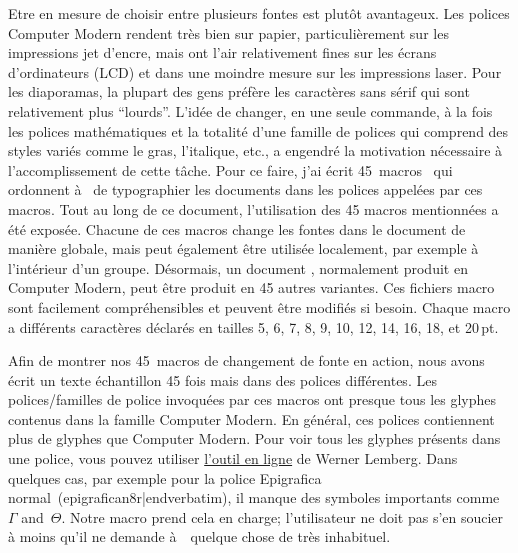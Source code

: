 {Etre en mesure de choisir entre plusieurs fontes est plut\^ot avantageux. Les polices Computer Modern rendent tr\`es bien sur papier, particuli\`erement sur les impressions jet d'encre, mais ont l'air relativement fines sur les \'ecrans d'ordinateurs (LCD) et dans une moindre mesure sur les impressions laser. Pour les diaporamas, la plupart des gens pr\'ef\`ere les caract\`eres sans s\'erif qui sont relativement plus ``lourds''. L'id\'ee de changer, en une seule commande, \`a la fois les polices math\'ematiques et la totalit\'e d'une famille de polices qui comprend des styles vari\'es comme le gras, l'italique, etc., a engendr\'e la motivation n\'ecessaire \`a l'accomplissement de cette t\^ache. Pour ce faire, j'ai \'ecrit 45~macros \capstex\ qui ordonnent \`a \capstex\ de typographier les documents dans les polices appel\'ees par ces macros. Tout au long de ce document, l'utilisation des 45 macros mentionn\'ees a \'et\'e expos\'ee. Chacune de ces macros change les fontes dans le document de mani\`ere globale, mais peut \'egalement \^etre utilis\'ee localement, par exemple \`a l'int\'erieur d'un groupe. D\'esormais, un document \capstex, normalement produit en Computer Modern, peut \^etre produit en 45 autres variantes. Ces fichiers macro sont facilement compr\'ehensibles et peuvent \^etre modifi\'es si besoin. Chaque macro a diff\'erents caract\`eres d\'eclar\'es en tailles 5, 6, 7, 8, 9, 10, 12, 14, 16, 18, et 20\,pt.

Afin de montrer nos 45~macros de changement de fonte en action, nous avons \'ecrit un texte \'echantillon 45 fois mais dans des polices diff\'erentes. Les polices/familles de police invoqu\'ees par ces macros ont presque tous les glyphes contenus dans la famille Computer Modern. En g\'en\'eral, ces polices contiennent plus de glyphes que Computer Modern. Pour voir tous les glyphes pr\'esents dans une police, vous pouvez utiliser \href{https://www.ctan.org/pkg/fontchart?lang=en}{l'outil en ligne} de Werner Lemberg. Dans quelques cas, par exemple pour la police Epigrafica normal~(\verbatim epigrafican8r|endverbatim), il manque des symboles importants comme $\Gamma$ and~$\Theta$. Notre macro prend cela en charge; l'utilisateur ne doit pas s'en soucier \`a moins qu'il ne demande \`a~\capstex\ quelque chose de tr\`es inhabituel.



}
